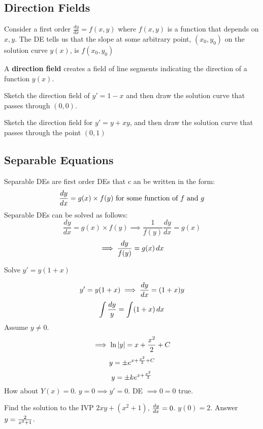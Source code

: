 \documentclass[english, 12pt]{article}
\begin{document}
\subsection{Direction Fields}
Consider a first order $\frac{dy}{dx} = f(x,y)$ where $f(x,y)$ is a function that depends on $x,y$. The DE tells us that the slope at some arbitrary point, $(x_{0},y_{0})$ on the solution curve $y(x)$, is $f(x_{0},y_{0})$
\begin{defn}
A \textbf{direction field} creates a field of line segments indicating the direction of a function $y(x)$.
\end{defn}

\begin{exmp}
Sketch the direction field of $y'=1-x$ and then draw the solution curve that passes through $(0,0)$.

\end{exmp}

\begin{exmp}
Sketch the direction field for $y'=y + xy$, and then draw the solution curve that passes through the point $(0,1)$

\end{exmp}
\subsection{Separable Equations}
Separable DEs are first order DEs that c an be written in the form:
\[ \frac{dy}{dx} = g(x) \times f(y) \text{ for some function of $f$ and $g$}\]
Separable DEs can be solved as follows:
\[ \frac{dy}{dx} = g(x)\times f(y) \implies \frac{1}{f(y)}\frac{dy}{dx} = g(x) \]
\[ \implies \frac{dy}{f(y)} = g(x)\,dx \]
\begin{exmp}
Solve $y' = y(1+x)$
\begin{sol}
\[ y' = y(1+x) \implies \frac{dy}{dx} = (1+x) y \]
\[ \int \frac{dy}{y} = \int(1+x)\,dx \]
Assume $y \neq 0$.\\
\[\implies \ln |y| = x + \frac{x^2}{2} + C \]
\[ y = \pm e^{x+\frac{x^2}{2} + C} \]
\[ y = \pm k e^{x+\frac{x^2}{2}} \]
How about $Y(x) = 0$. $y = 0 \implies y' = 0$. DE $\implies 0 = 0$ true.
\end{sol}
\end{exmp}
\begin{exercise}
Find the solution to the IVP $2xy + (x^2 +1)$, $\frac{dy}{dx}=0$. $y(0)=2$. Answer $y=\frac{2}{x^2+1}$.
\end{exercise}
\end{document}
